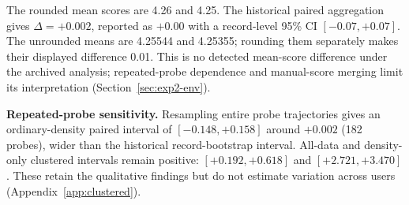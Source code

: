 \documentclass[twoside,11pt]{article}
\begin{document}
\begin{table}[tbp]
\centering
\small


\caption{Experiment 2, global comparison, Dataset C excluded (1{,}057 probe--checkpoint observations across 3 conversations). On the conversations where both systems can generate usable answers, ICE v2 has similar mean scores to the vector baseline, injects 32\% fewer fragments, and ranks first in 30.6\% of four-condition tournaments versus 21.2\%.}
\label{tab:exp2-global}
\end{table}

The rounded mean scores are 4.26 and 4.25. The historical paired aggregation gives $\Delta=+0.002$, reported as $+0.00$ with a record-level 95\% CI $[-0.07,+0.07]$. The unrounded means are 4.25544 and 4.25355; rounding them separately makes their displayed difference 0.01. This is no detected mean-score difference under the archived analysis; repeated-probe dependence and manual-score merging limit its interpretation (Section~\ref{sec:exp2-env}).

\textbf{Repeated-probe sensitivity.} Resampling entire probe trajectories gives an ordinary-density paired interval of $[-0.148,+0.158]$ around $+0.002$ (182 probes), wider than the historical record-bootstrap interval. All-data and density-only clustered intervals remain positive: $[+0.192,+0.618]$ and $[+2.721,+3.470]$. These retain the qualitative findings but do not estimate variation across users (Appendix~\ref{app:clustered}).
\end{document}
